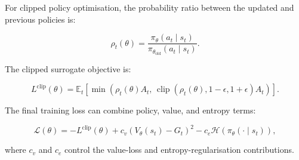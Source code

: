 For clipped policy optimisation, the probability ratio between the updated and previous policies is:

\begin{equation}
\rho_t(\theta) =
\frac{\pi_\theta(a_t \mid s_t)}
{\pi_{\theta_{\mathrm{old}}}(a_t \mid s_t)}.
\label{eq:ratio}
\end{equation}

The clipped surrogate objective is:

\begin{equation}
L^{\mathrm{clip}}(\theta) =
\mathbb{E}_t
\left[
\min\left(
\rho_t(\theta) A_t,\,
\operatorname{clip}\left(\rho_t(\theta), 1-\epsilon, 1+\epsilon\right) A_t
\right)
\right].
\label{eq:ppo}
\end{equation}

The final training loss can combine policy, value, and entropy terms:

\begin{equation}
\mathcal{L}(\theta) =
-L^{\mathrm{clip}}(\theta)
+ c_v \left(V_\theta(s_t) - G_t\right)^2
- c_e \mathcal{H}\left(\pi_\theta(\cdot \mid s_t)\right),
\label{eq:combined-loss}
\end{equation}

where $c_v$ and $c_e$ control the value-loss and entropy-regularisation contributions.
